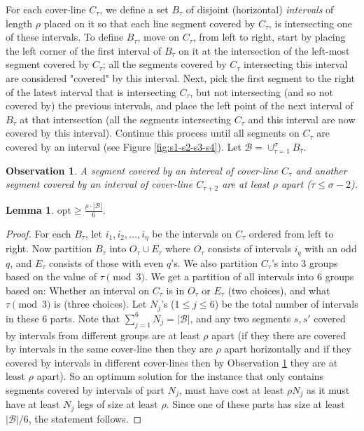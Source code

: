 \documentclass[10pt,a4paper]{amsart}
\theoremstyle{thmstyleone}
\newtheorem{lemma}{Lemma}
\newtheorem{observation}{Observation} %
\newcommand{\opt}{{\text{opt}}}
\begin{document}
For each cover-line $C_\tau$, we define a set $B_\tau$ of disjoint (horizontal) {\em intervals} of length $\rho$ placed on it so that each line segment covered by $C_\tau$, is intersecting one of these intervals. To define $B_\tau$, move on $ C_\tau $, from left to right, start by placing the left corner of the first interval of $B_\tau$ on it at the intersection of the left-most segment covered by $C_\tau$; all the segments covered by $C_\tau$ intersecting this interval are considered "covered" by this interval. Next, pick the first segment to the right of the latest interval that is intersecting $C_\tau$, but not intersecting (and so not covered by) the previous intervals, and place the left point of the next interval of $B_\tau$ at that intersection (all the segments intersecting $C_\tau$ and this interval are now covered by this interval). Continue this process until all segments on $ C_\tau $ are covered by an interval (see Figure \ref{fig:s1-s2-s3-s4}). 
Let $\mathcal B=\cup_{\tau=1}^\sigma B_\tau$.

\begin{observation}\label{obs:box-apart}
    A segment covered by an interval of cover-line $C_\tau$ and another segment covered by an interval of cover-line $C_{\tau+2}$ are at least $\rho$ apart ($\tau\leq \sigma-2$). 
\end{observation}

\begin{lemma}\label{lemma:box-size-opt-ineq}
    $\displaystyle\opt\geq \frac{\rho\cdot |\mathcal B|}{6}.$
\end{lemma}
\begin{proof}
For each $B_\tau$, let $i_1, i_2,\dots, i_\eta$ be the intervals on $ C_\tau $ ordered from left to right. Now partition $ B_\tau $ into $ O_\tau \cup E_\tau $ where
	$O_\tau$ consists of intervals $i_q$ with an odd $q$, and $E_\tau$ consists of those with even $q$'s. We also partition $C_\tau$'s into 3 groups based on the value of $\tau\pmod 3$.
	We get a partition of all intervals into 6 groups based on: Whether an interval on $C_\tau$ is in $O_\tau$ or $E_\tau$ (two choices), and what $\tau \pmod 3$ is (three choices). 
	Let $N_j$'s ($1\leq j\leq 6$) be the total number of intervals in these 6 parts. 
	Note that $\sum_{j=1}^6 N_j=|\mathcal B|$, and any two segments $s,s'$ covered by intervals from different groups are at least $\rho$ apart (if they there are 
	covered by intervals in the same cover-line then they are $\rho$ apart horizontally and if they covered by intervals in different cover-lines then by Observation \ref{obs:box-apart} they are at least $\rho$ apart).
	So an optimum solution for the instance that only contains segments covered by intervals of part $N_j$, must have cost at least $\rho N_j$ as it must have at least $N_j$ legs of size at least $\rho$. Since one of these parts has size at least $|\mathcal B|/6$, the statement follows.
\end{proof}
\end{document}
